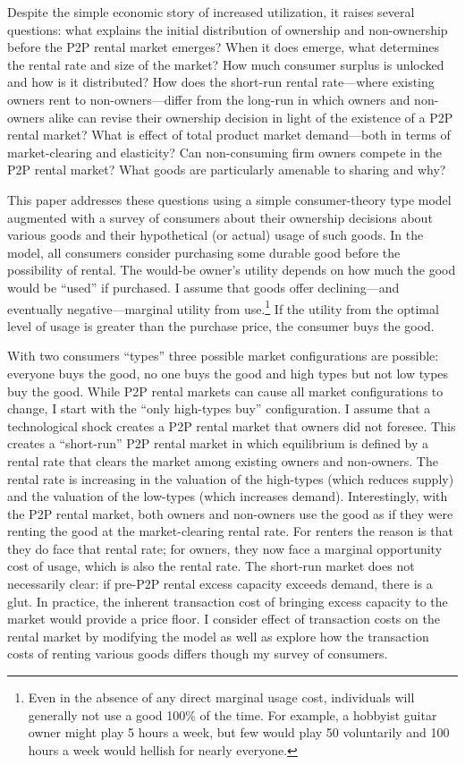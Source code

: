\documentclass[11pt]{article}
\begin{document}
Despite the simple economic story of increased utilization, it raises several questions:
what explains the initial distribution of ownership and non-ownership before the P2P rental market emerges?
When it does emerge, what determines the rental rate and size of the market? 
How much consumer surplus is unlocked and how is it distributed? 
How does the short-run rental rate---where existing owners rent to non-owners---differ from the long-run in which owners and non-owners alike can revise their ownership decision in light of the existence of a P2P rental market?  
What is effect of total product market demand---both in terms of market-clearing and elasticity?  
Can non-consuming firm owners compete in the P2P rental market? 
What goods are particularly amenable to sharing and why?
  
This paper addresses these questions using a simple consumer-theory type model augmented with a survey of consumers about their ownership decisions about various goods and their hypothetical (or actual) usage of such goods. 
In the model, all consumers consider purchasing some durable good before the possibility of rental.   
The would-be owner's utility depends on how much the good would be ``used'' if purchased.
I assume that goods offer declining---and eventually negative---marginal utility from use.\footnote{Even in the absence of any direct marginal usage cost, individuals will generally not use a good 100\% of the time. 
For example, a hobbyist guitar owner might play 5 hours a week, but few would play 50 voluntarily and 100 hours a week would hellish for nearly everyone.} 
If the utility from the optimal level of usage is greater than the purchase price, the consumer buys the good. 

With two consumers ``types'' three possible market configurations are possible: 
everyone buys the good, no one buys the good and high types but not low types buy the good.  
While P2P rental markets can cause all market configurations to change, I start with the ``only high-types buy'' configuration. 
I assume that a technological shock creates a P2P rental market that owners did not foresee. 
This creates a ``short-run'' P2P rental market in which equilibrium is defined by a rental rate that clears the market among existing owners and non-owners. 
The rental rate is increasing in the valuation of the high-types (which reduces supply) and the valuation of the low-types (which increases demand). 
Interestingly, with the P2P rental market, both owners and non-owners use the good as if they were renting the good at the market-clearing rental rate. 
For renters the reason is that they do face that rental rate; 
for owners, they now face a marginal opportunity cost of usage, which is also the rental rate. 
The short-run market does not necessarily clear: if pre-P2P rental excess capacity exceeds demand, there is a glut. 
In practice, the inherent transaction cost of bringing excess capacity to the market would provide a price floor.     
I consider effect of transaction costs on the rental market by modifying the model as well as explore how the transaction costs of renting various goods differs though my survey of consumers. 
\end{document}
